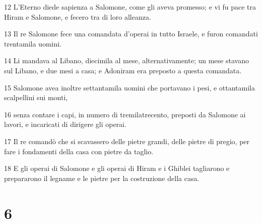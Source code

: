 \par 12 L'Eterno diede sapienza a Salomone, come gli aveva promesso; e vi fu pace tra Hiram e Salomone, e fecero tra di loro alleanza.
\par 13 Il re Salomone fece una comandata d'operai in tutto Israele, e furon comandati trentamila uomini.
\par 14 Li mandava al Libano, diecimila al mese, alternativamente; un mese stavano sul Libano, e due mesi a casa; e Adoniram era preposto a questa comandata.
\par 15 Salomone avea inoltre settantamila uomini che portavano i pesi, e ottantamila scalpellini sui monti,
\par 16 senza contare i capi, in numero di tremilatrecento, preposti da Salomone ai lavori, e incaricati di dirigere gli operai.
\par 17 Il re comandò che si scavassero delle pietre grandi, delle pietre di pregio, per fare i fondamenti della casa con pietre da taglio.
\par 18 E gli operai di Salomone e gli operai di Hiram e i Ghiblei tagliarono e prepararono il legname e le pietre per la costruzione della casa.

\chapter{6}

